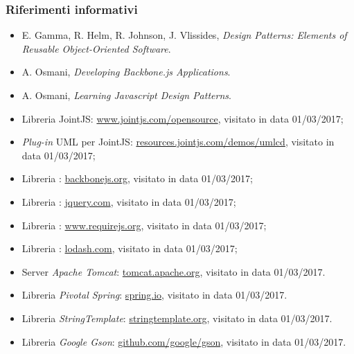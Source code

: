\subsubsection{Riferimenti informativi}
\begin{itemize}
	\item E. Gamma, R. Helm, R. Johnson, J. Vlissides, \emph{Design Patterns: Elements of Reusable Object-Oriented Software}.
	\item A. Osmani, \emph{Developing Backbone.js Applications}.
	\item A. Osmani, \emph{Learning Javascript Design Patterns}.
	\item Libreria JointJS: \url{www.jointjs.com/opensource}, visitato in data 01/03/2017;
	\item \emph{Plug-in} UML per JointJS: \url{resources.jointjs.com/demos/umlcd}, visitato in data 01/03/2017;
	\item Libreria \backbonejs: \url{backbonejs.org}, visitato in data 01/03/2017;
	\item Libreria \jquery: \url{jquery.com}, visitato in data 01/03/2017;
	\item Libreria \requirejs: \url{www.requirejs.org}, visitato in data 01/03/2017;
	\item Libreria \lodash: \url{lodash.com}, visitato in data 01/03/2017;
	\item Server \emph{Apache Tomcat}: \url{tomcat.apache.org}, visitato in data 01/03/2017.
	\item Libreria \emph{Pivotal Spring}: \url{spring.io}, visitato in data 01/03/2017.
	\item Libreria \emph{StringTemplate}: \url{stringtemplate.org}, visitato in data 01/03/2017.
	\item Libreria \emph{Google Gson}: \url{github.com/google/gson}, visitato in data 01/03/2017.
\end{itemize}
